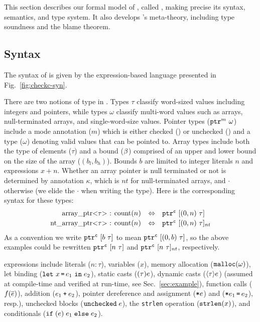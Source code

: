 This section describes our formal model of \checkedc, called
\lang, making precise its syntax, semantics, and type system. It also
develops \lang's meta-theory, including type soundness and the blame
theorem.

\subsection{Syntax}\label{sec:syntax}

The syntax of \lang is given by the expression-based
language presented in Fig.~\ref{fig:checkc-syn}.

There are two notions of type in \lang.  Types $\tau$ classify
word-sized values including integers and pointers, while types
$\omega$ classify multi-word values such as arrays, null-terminated
arrays, and single-word-size values.
%
Pointer types ($\mathtt{ptr}^{m}~{\omega}$) include a mode annotation ($m$)
which is either checked (\cmode) or unchecked (\umode) and a type
($\omega$) denoting valid values that can be pointed to. Array types include both the type of
elements ($\tau$) and a bound ($\beta$) comprised of an upper and
lower bound on the size of the array ($(b_l,b_h)$). Bounds $b$ are
limited to integer literals $n$ and expressions $x + n$.
Whether an array pointer is null terminated or not is determined by annotation
$\kappa$, which is $nt$ for null-terminated arrays, and $\cdot$
otherwise (we elide the $\cdot$ when writing the type). Here is the
corresponding \checkedc syntax for these types:
\[
\begin{array}{rcl}
$\code{array_ptr<}$\tau$\code{> : count(}$n$\code{)}$
&\Leftrightarrow& \tarrayptr{0}{n}{\tau}{\cmode}
\\[0.2em]
$\code{nt_array_ptr<}$\tau$\code{> : count(}$n$\code{)}$
&\Leftrightarrow& \tntarrayptr{0}{n}{\tau}{\cmode}
\end{array}
\]
As a convention we write $\mathtt{ptr}^{\texttt{c}}~{[{b}~{\tau}]}$ to mean
$\mathtt{ptr}^{\texttt{c}}~{[{({0},{b})}~{\tau}]}$, so the above examples could
be rewritten $\mathtt{ptr}^{\texttt{c}}~{[{n}~{\tau}]}$ and
$\mathtt{ptr}^{\texttt{c}}~{[{n}~{\tau}]_{nt}}$, respectively.

\lang expressions include literals ($n\!:\!\tau$), variables ($x$), memory
allocation ($\mathtt{malloc}({\omega})$), let binding ($\mathtt{let}~x\, \texttt{=}\, e_1~\mathtt{in}\;{e_2}$),
static casts ($\mathtt{(}{\tau}\mathtt{)}{e}$), dynamic casts ($\langle{\tau}\rangle{e}$)
(assumed at compile-time and verified at run-time, see Sec.~\ref{sec:example}),
function calls (${f}({\overline{e}})$), addition
($e_1 \mathbin{\texttt{+}} e_2$), pointer dereference and assignment ($\texttt{*}{e}$)
and ($\texttt{*}{e_1}\,\texttt{=}\, {e_2}$), resp.), unchecked blocks ($\mathtt{unchecked}\;{e}$),
the \texttt{strlen} operation ($\mathtt{strlen}({x})$), and conditionals ($\mathtt{if\;}(e)\;{e_1}\;\mathtt{else}\;{e_2}$).

